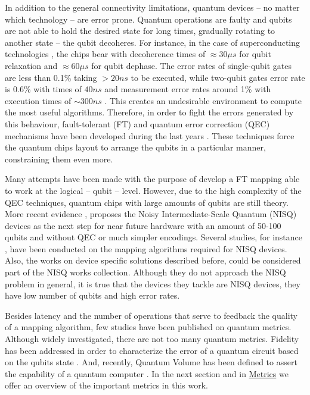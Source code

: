 In addition to the general connectivity limitations, quantum devices -- no matter which technology -- are error prone.
Quantum operations are faulty and qubits are not able to hold the desired state for long times, gradually rotating to another state -- the qubit decoheres.
For instance, in the case of superconducting technologies \cite{O_Brien_2017}, the chips bear with decoherence times of \(\approx 30 \mu s\) for qubit relaxation and \(\approx 60 \mu s\) for qubit dephase.
The error rates of single-qubit gates are less than 0.1\% taking \(> 20 ns\) to be executed, while two-qubit gates error rate is 0.6\% with times of \(40 ns\) and measurement error rates around 1\% with execution times of \(\sim 300 ns\) \cite{O_Brien_2017,Versluis_2017}.
This creates an undesirable environment to compute the most useful algorithms.
Therefore, in order to fight the errors generated by this behaviour, fault-tolerant (FT) and quantum error correction (QEC) mechanisms have been developed during the last years \cite{Nielsen_2009}.
These techniques force the quantum chips layout to arrange the qubits in a particular manner, constraining them even more.

Many attempts have been made \cite{Dousti_2014,Heckey_2015,hwang18:hierar_system_mappin_large_scale,murphy18:contr,Lao_2018} with the purpose of develop a FT mapping able to work at the logical -- qubit -- level.
However, due to the high complexity of the QEC techniques, quantum chips with large amounts of qubits are still theory.
More recent evidence \cite{Preskill_2018}, proposes the Noisy Intermediate-Scale Quantum (NISQ) devices as the next step for near future hardware with an amount of 50-100 qubits and without QEC or much simpler encodings.
Several studies, for instance \cite{tannu18:case_variab_aware_polic_nisq,paler18:nisq,paler18:influen_initial_qubit_placem_durin}, have been conducted on the mapping algorithms required for NISQ devices.
Also, the works on device specific solutions \cite{zulehner17:effic_method_mappin_quant_circuit,Siraichi_2018,mckay18:qiskit_backen_specif_openq_openp_exper,Dueck_2018,Venturelli_2018} described before, could be considered part of the NISQ works collection.
Although they do not approach the NISQ problem in general, it is true that the devices they tackle are NISQ devices, they have low number of qubits and high error rates.

Besides latency and the number of operations that serve to feedback the quality of a mapping algorithm, few studies have been published on quantum metrics.
Although widely investigated, there are not too many quantum metrics.
Fidelity has been addressed in order to characterize the error of a quantum circuit based on the qubits state \cite{Jozsa_1994,Nielsen_2009}.
And, recently, Quantum Volume has been defined to assert the capability of a quantum computer \cite{Moll_2018}.
In the next section and in \href{chapter-3.org}{Metrics} we offer an overview of the important metrics in this work.

